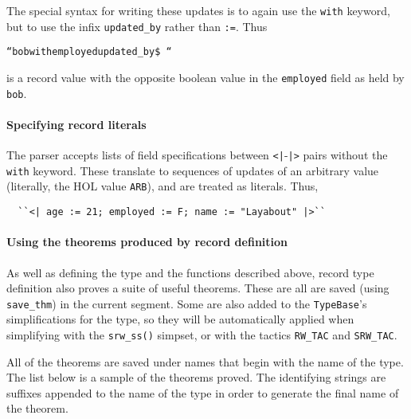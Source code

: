 The special syntax for writing these updates is to again use the
\texttt{with} keyword, but to use the infix \texttt{updated\_by}
rather than \texttt{:=}.  Thus
\begin{alltt}
  ``bob with employed updated_by \$~``
\end{alltt} \noindent
is a record value with the opposite boolean value in the
\texttt{employed} field as held by \texttt{bob}.

\paragraph{Specifying record literals}

The parser accepts lists of field specifications between
\texttt{<|}-\texttt{|>} pairs without the \texttt{with} keyword.
These translate to sequences of updates of an arbitrary value
(literally, the HOL value \texttt{ARB}), and are treated as literals.
Thus,
\begin{verbatim}
  ``<| age := 21; employed := F; name := "Layabout" |>``
\end{verbatim}

\paragraph{Using the theorems produced by record definition}

As well as defining the type and the functions described above, record
type definition also proves a suite of useful theorems.  These are
all are saved (using {\tt save\_thm}) in the current segment.  Some
are also added to the \texttt{TypeBase}'s simplifications for the
type, so they will be automatically applied when simplifying with the
\texttt{srw\_ss()} simpset, or with the tactics \texttt{RW\_TAC} and
\texttt{SRW\_TAC}.

All of the theorems are saved under names that begin with the name of
the type.  The list below is a sample of the theorems proved.  The
identifying strings are suffixes appended to the name of the type in
order to generate the final name of the theorem.

\newcommand{\rewruse}{This theorem is installed in the \texttt{TypeBase}.}
\newcommand{\field}[1]{\mbox{\it field}_{#1}}
\newcommand{\update}{\mbox{\tt\_update}}

